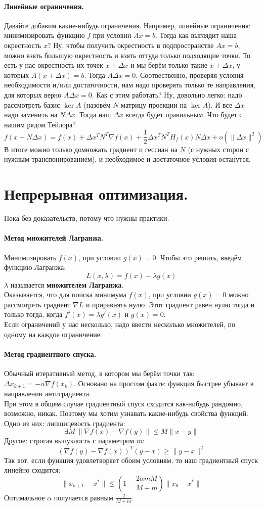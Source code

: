 \documentclass{article}
\begin{document}
    \paragraph{Линейные ограничения.}
    Давайте добавим какие-нибудь ограничения. Например, линейные ограничения: минимизировать функцию $f$ при условии $Ax=b$. Тогда как выглядит наша окрестность $x$? Ну, чтобы получить окрестность в подпространстве $Ax=b$, можно взять большую окрестность и взять оттуда только подходящие точки. То есть у нас окрестность их точек $x+\Delta x$ и мы берём только такие $x+\Delta x$, у которых $A(x+\Delta x)=b$. Тогда $A\Delta x=0$. Соотвественно, проверяя условия необходимости и/или достаточности, нам надо проверять только те направления, для которых верно $A\Delta x=0$. Как с этим работать? Ну, довольно легко: надо рассмотреть базис $\ker A$ (назовём $N$ матрицу проекции на $\ker A$). И все $\Delta x$ надо заменить на $N\Delta x$. Тогда наш $\Delta x$ всегда будет правильным. Что будет с нашим рядом Тейлора?
    \[
    f(x+N\Delta x)=f(x)+\Delta x^TN^T\nabla f(x)+\frac12\Delta x^TN^TH_f(x)N\Delta x+o(\|\Delta x\|^2)
    \]
    В итоге можно только домножать градиент и гессиан на $N$ (с нужных сторон с нужным транспонированием), и необходимое и достаточное условия останутся.
    \section{Непрерывная оптимизация.}
    Пока без доказательств, потому что нужны практики.
    \paragraph{Метод множителей Лагранжа.}
    Минимизировать $f(x)$, при условии $g(x)=0$. Чтобы это решить, введём функцию Лагранжа:
    $$
    L(x,\lambda)=f(x)-\lambda g(x)
    $$
    $\lambda$ называется \textbf{множителем Лагранжа}.\\
    Оказывается, что для поиска минимума $f(x)$, при условии $g(x)=0$ можно рассмотреть градиент $\nabla L$ и приравнять нулю. Этот градиент равен нулю тогда и только тогда, когда $f'(x)=\lambda g'(x)$ и $g(x)=0$.\\
    Если ограничений у нас несколько, надо ввести несколько множителей, по одному на каждое ограничение.
    \paragraph{Метод градиентного спуска.}
    Обычный итеративный метод, в котором мы берём точки так: $\Delta x_{k+1}=-\alpha\nabla f(x_k)$. Основано на простом факте: функция быстрее убывает в направлении антиградиента.\\
    При этом в общем случае градиентный спуск сходится как-нибудь рандомно, возможно, никак. Поэтому мы хотим узнавать какие-нибудь свойства функций. Одно из них: липшицевость градиента:
    \[
    \exists M~\|\nabla f(x)-\nabla f(y)\|\leqslant M\|x-y\|
    \]
    Другое: строгая выпуклость с параметром $m$:
    \[
    (\nabla f(y)-\nabla f(x))^T(y-x)\geqslant\|y-x\|^2
    \]
    Так вот, если функция удовлетворяет обоим условиям, то наш градиентный спуск линейно сходится:
    \[
    \|x_{k+1}-x^*\|\leqslant\left(1-\frac{2\alpha mM}{M+m}\right)\|x_0-x^*\|
    \]
    Оптимальное $\alpha$ получается равным $\frac2{M+m}$.
\end{document}

